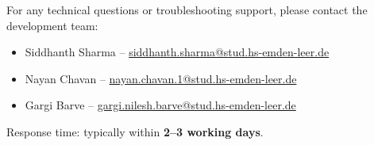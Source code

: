 \documentclass[12pt,a4paper]{scrbook}
\begin{document}
\hypersetup{pageanchor=false}

\newpage
\hypersetup{pageanchor=true}


\tableofcontents
\cleardoublepage

\listoffigures
\cleardoublepage

\listoftables
\cleardoublepage



\vspace{0.5cm}

\clearpage
\begin{tcolorbox}[colback=blue!5!white,colframe=blue!60!black,
	title={\faEnvelope\hspace{0.5em}Contact for Technical Assistance}, fonttitle=\bfseries]
	For any technical questions or troubleshooting support, please contact the development team:
	\begin{itemize}
		\item Siddhanth Sharma -- \href{mailto:siddhanth.sharma@stud.hs-emden-leer.de}{siddhanth.sharma@stud.hs-emden-leer.de}
		\item Nayan Chavan -- \href{mailto:nayan.chavan.1@stud.hs-emden-leer.de}{nayan.chavan.1@stud.hs-emden-leer.de}
		\item Gargi Barve -- \href{mailto:gargi.nilesh.barve@stud.hs-emden-leer.de}{gargi.nilesh.barve@stud.hs-emden-leer.de}
	\end{itemize}
	Response time: typically within \textbf{2--3 working days}.
\end{tcolorbox}

\cleardoublepage

\end{document}

